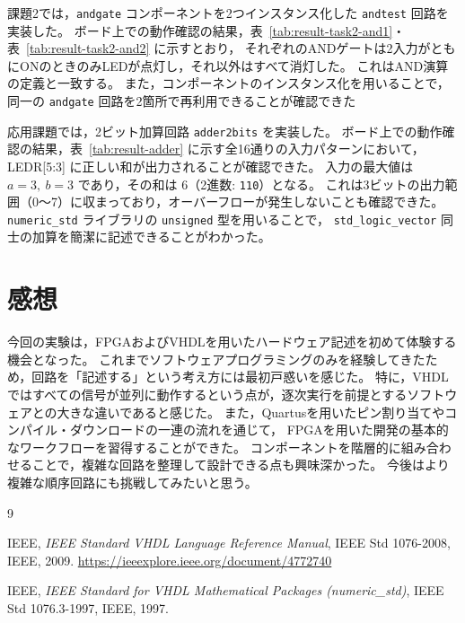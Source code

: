 \documentclass[12pt,a4paper]{ltjsarticle}
\begin{document}
課題2では，\texttt{andgate} コンポーネントを2つインスタンス化した \texttt{andtest} 回路を実装した。
ボード上での動作確認の結果，表~\ref{tab:result-task2-and1}・表~\ref{tab:result-task2-and2} に示すとおり，
それぞれのANDゲートは2入力がともにONのときのみLEDが点灯し，それ以外はすべて消灯した。
これはAND演算の定義と一致する。
また，コンポーネントのインスタンス化を用いることで，同一の \texttt{andgate} 回路を2箇所で再利用できることが確認できた

応用課題では，2ビット加算回路 \texttt{adder2bits} を実装した。
ボード上での動作確認の結果，表~\ref{tab:result-adder} に示す全16通りの入力パターンにおいて，
LEDR[5:3] に正しい和が出力されることが確認できた。
入力の最大値は $a = 3,\ b = 3$ であり，その和は $6$（2進数: \texttt{110}）となる。
これは3ビットの出力範囲（0〜7）に収まっており，オーバーフローが発生しないことも確認できた。
\texttt{numeric\_std} ライブラリの \texttt{unsigned} 型を用いることで，
\texttt{std\_logic\_vector} 同士の加算を簡潔に記述できることがわかった。

\newpage
\section{感想}\label{sec:impression}

今回の実験は，FPGAおよびVHDLを用いたハードウェア記述を初めて体験する機会となった。
これまでソフトウェアプログラミングのみを経験してきたため，回路を「記述する」という考え方には最初戸惑いを感じた。
特に，VHDLではすべての信号が並列に動作するという点が，逐次実行を前提とするソフトウェアとの大きな違いであると感じた。
また，Quartusを用いたピン割り当てやコンパイル・ダウンロードの一連の流れを通じて，
FPGAを用いた開発の基本的なワークフローを習得することができた。
コンポーネントを階層的に組み合わせることで，複雑な回路を整理して設計できる点も興味深かった。
今後はより複雑な順序回路にも挑戦してみたいと思う。

\begin{thebibliography}{9}

IEEE,
\textit{IEEE Standard VHDL Language Reference Manual},
IEEE Std 1076-2008, IEEE, 2009.
\url{https://ieeexplore.ieee.org/document/4772740}

IEEE,
\textit{IEEE Standard for VHDL Mathematical Packages (numeric\_std)},
IEEE Std 1076.3-1997, IEEE, 1997.

\end{thebibliography}
\end{document}
